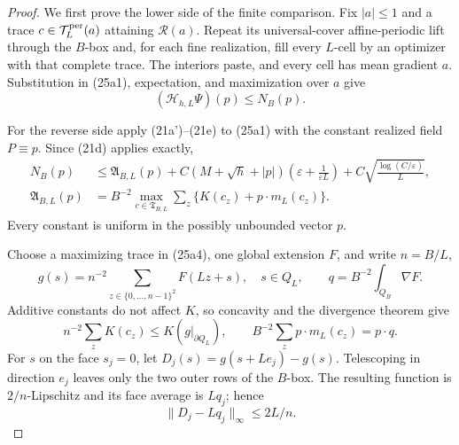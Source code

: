 \documentclass{aomart}
\theoremstyle{definition}
\newcommand{\1}{\mathbf 1}
\begin{document}
\begin{proof}
We first prove the lower side of the finite comparison.  Fix
$|a|\leq1$ and a trace $c\in\mathcal T_ L^{\rm per}(a)$ attaining
$\mathcal R(a)$.  Repeat its universal-cover affine-periodic lift through the $B$-box
and, for each fine realization, fill every $L$-cell by an optimizer
with that complete trace.  The interiors paste, and every cell has mean
gradient $a$.  Substitution in (25a1), expectation, and maximization
over $a$ give
\begin{equation}
(\mathcal H_ {h,L}\Psi)(p)\leq N_ B(p).
\tag{25a2}
\end{equation}

For the reverse side apply (21a')--(21e) to (25a1) with the constant
realized field $P\equiv p$.  Since (21d) applies exactly,
\begin{align}
N_ B(p)&\leq \mathfrak A_ {B,L}(p)
+C(M+\sqrt h+|p|)
\left(\varepsilon+\frac1{\varepsilon L}\right)
+C\sqrt{\frac{\log(C/\varepsilon)}L},                         \tag{25a3}\\
\mathfrak A_ {B,L}(p)&=B^{-2}\max_ {c\in\mathfrak T_ {B,L}}
\sum_ z\{K(c_ z)+p\cdot m_ L(c_ z)\}.                       \tag{25a4}
\end{align}
Every constant is uniform in the possibly unbounded vector $p$.

Choose a maximizing trace in (25a4), one global extension $F$, and
write $n=B/L$,
\begin{equation}
g(s)=n^{-2}\sum_ {z\in\{0,\ldots,n-1\}^2}F(Lz+s),\quad s\in Q_ L,
\qquad q=B^{-2}\int_ {Q_ B}\nabla F.
\tag{25a5}
\end{equation}
Additive constants do not affect $K$, so concavity and the divergence
theorem give
\begin{equation}
n^{-2}\sum_ zK(c_ z)\leq K(g|_ {\partial Q_ L}),\qquad
B^{-2}\sum_ zp\cdot m_ L(c_ z)=p\cdot q.
\tag{25a6}
\end{equation}
For $s$ on the face $s_ j=0$, let
$D_ j(s)=g(s+Le_ j)-g(s)$.  Telescoping in direction $e_ j$ leaves
only the two outer rows of the $B$-box.  The resulting function is
$2/n$-Lipschitz and its face average is $Lq_ j$; hence
\begin{equation}
\|D_ j-Lq_ j\|_ \infty\leq2L/n.
\tag{25a7}
\end{equation}


\end{proof}
\end{document}
